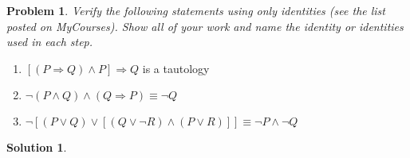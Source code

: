 \documentclass{article}
\newtheorem{problem}{Problem}
\theoremstyle{definition}
\newtheorem*{solution}{Solution}
\begin{document}
\begin{problem}
Verify the following statements using only identities (see the list posted on MyCourses). Show all of your work and name the identity or identities used in each step.
\end{problem}

\begin{enumerate}[label = \alph*)]
\item $[(P \Rightarrow Q) \wedge P] \Rightarrow Q$ is a tautology

\item $\neg (P \wedge Q) \wedge (Q \Rightarrow P) \equiv \neg Q$

\item $\neg [(P \vee Q) \vee [(Q \vee \neg R) \wedge (P \vee R)]] \equiv \neg P \wedge \neg Q$
\end{enumerate}

\begin{solution}
\end{solution}
\end{document}
